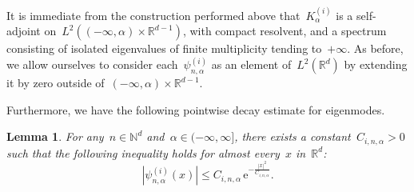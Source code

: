 \documentclass[10pt]{article}
\newcommand{\e}{\mathrm{e}}
\newcommand{\R}{\mathbb{R}}
\newcommand{\N}{\mathbb N}
\newcommand{\1}{\mathbbm 1}
\newcommand{\Ki}[1]{K^{(i)}_{#1}}
\newcommand{\psii}[2]{\psi^{(i)}_{#1,#2}}
\newtheorem{lemma}{Lemma}
\begin{document}
    It is immediate from the construction performed above that~$\Ki{\alpha}$ is a self-adjoint on~$L^2((-\infty,\alpha)\times\R^{d-1})$, with compact resolvent, and a spectrum consisting of isolated eigenvalues of finite multiplicity tending to~$+\infty$.
    As before, we allow ourselves to consider each~$\psii{n}{\alpha}$ as an element of~$L^2(\R^d)$ by extending it by zero outside of~$(-\infty,\alpha)\times\R^{d-1}$.

    Furthermore, we have the following pointwise decay estimate for eigenmodes.
    \begin{lemma}
        For any~$n\in\N^d$ and~$\alpha\in(-\infty,\infty]$, there exists a constant~$C_{i,n,\alpha}>0$ such that the following inequality holds for almost every~$x$ in~$\R^d$:
        \begin{equation}
            \label{eq:exponential_decay}
            |\psii{n}{\alpha}(x)| \leq C_{i,n,\alpha}\,\e^{-\frac{|x|^2}{C_{i,n,\alpha}}}.
        \end{equation}
    \end{lemma}
\end{document}
